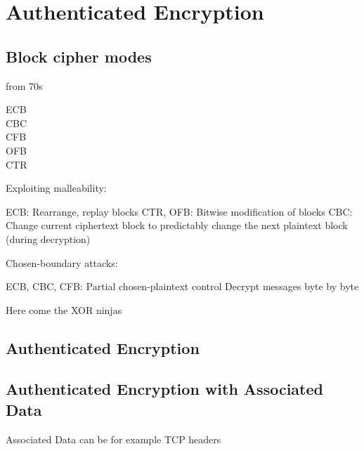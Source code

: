 \chapter{Authenticated Encryption}


\section{Block cipher modes}

from 70s

\begin{description}
  \item[ECB]
  \item[CBC]
  \item[CFB]
  \item[OFB]
  \item[CTR]
\end{description}


Exploiting malleability:

ECB: Rearrange, replay blocks
CTR, OFB: Bitwise modification of blocks
CBC: Change current ciphertext block to predictably change the next plaintext block (during decryption)

Chosen-boundary attacks:

ECB, CBC, CFB: Partial chosen-plaintext control
Decrypt messages byte by byte

Here come the XOR ninjas

\section{Authenticated Encryption}
\section{Authenticated Encryption with Associated Data}

Associated Data can be for example TCP headers





